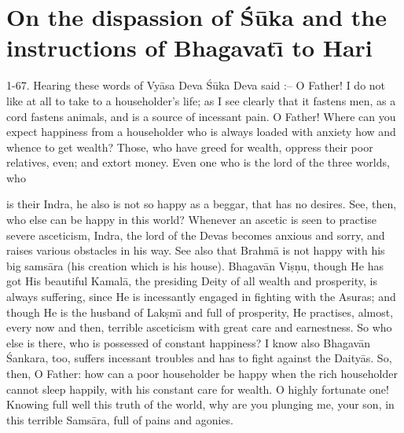 \chapter{On the dispassion of \'S\=uka and the instructions of Bhagavat\={\i} to Hari}

1-67. Hearing these words of Vy\=asa Deva \'S\=uka Deva said :-- O Father! I do not like at all to take to a householder's life; as I see clearly that it fastens men, as a cord fastens animals, and is a source of incessant pain. O Father! Where can you expect happiness from a householder who is always loaded with anxiety how and whence to get wealth? Those, who have greed for wealth, oppress their poor relatives, even; and extort money. Even one who is the lord of the three worlds, who

is their Indra, he also is not so happy as a beggar, that has no desires. See, then, who else can be happy in this world? Whenever an ascetic is seen to practise severe asceticism, Indra, the lord of the Devas becomes anxious and sorry, and raises various obstacles in his way. See also that Brahm\=a is not happy with his big sams\=ara (his creation which is his house). Bhagav\=an Vi\d{s}\d{n}u, though He has got His beautiful Kamal\=a, the presiding Deity of all wealth and prosperity, is always suffering, since He is incessantly engaged in fighting with the Asuras; and though He is the husband of Lak\d{s}m\={\i} and full of prosperity, He practises, almost, every now and then, terrible asceticism with great care and earnestness. So who else is there, who is possessed of constant happiness? I know also Bhagav\=an \'Sankara, too, suffers incessant troubles and has to fight against the Daity\=as. So, then, O Father: how can a poor householder be happy when the rich householder cannot sleep happily, with his constant care for wealth. O highly fortunate one! Knowing full well this truth of the world, why are you plunging me, your son, in this terrible Sams\=ara, full of pains and agonies.

